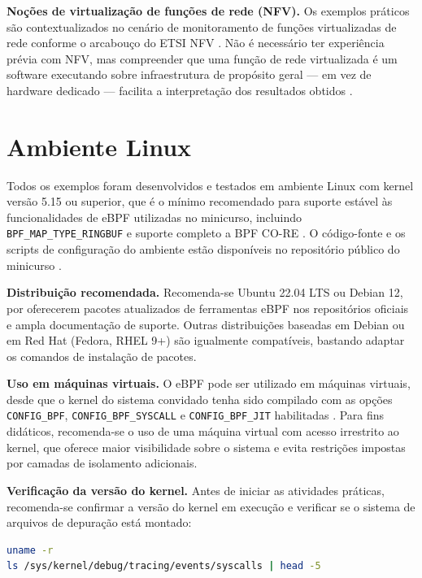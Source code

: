 \textbf{Noções de virtualização de funções de rede (NFV).}
Os exemplos práticos são contextualizados no cenário de monitoramento de funções
virtualizadas de rede conforme o arcabouço do ETSI NFV \cite{etsi2014}.
Não é necessário ter experiência prévia com NFV, mas compreender que uma função
de rede virtualizada é um software executando sobre infraestrutura de propósito
geral --- em vez de hardware dedicado --- facilita a interpretação dos resultados
obtidos \cite{venancio2021}.

\section{Ambiente Linux}

Todos os exemplos foram desenvolvidos e testados em ambiente Linux com kernel
versão 5.15 ou superior, que é o mínimo recomendado para suporte estável às
funcionalidades de eBPF utilizadas no minicurso, incluindo
\texttt{BPF\_MAP\_TYPE\_RINGBUF} e suporte completo a BPF CO-RE
\cite{linuxkernel2024}.
O código-fonte e os scripts de configuração do ambiente estão disponíveis no
repositório público do minicurso \cite{plinta2026repo}.

\textbf{Distribuição recomendada.}
Recomenda-se Ubuntu 22.04 LTS ou Debian 12, por oferecerem pacotes atualizados
de ferramentas eBPF nos repositórios oficiais e ampla documentação de suporte.
Outras distribuições baseadas em Debian ou em Red Hat (Fedora, RHEL 9+) são
igualmente compatíveis, bastando adaptar os comandos de instalação de pacotes.

\textbf{Uso em máquinas virtuais.}
O eBPF pode ser utilizado em máquinas virtuais, desde que o kernel do sistema
convidado tenha sido compilado com as opções \texttt{CONFIG\_BPF},
\texttt{CONFIG\_BPF\_SYSCALL} e \texttt{CONFIG\_BPF\_JIT} habilitadas
\cite{linuxkernel2024}.
Para fins didáticos, recomenda-se o uso de uma máquina virtual com acesso
irrestrito ao kernel, que oferece maior visibilidade sobre o sistema e evita
restrições impostas por camadas de isolamento adicionais.

\textbf{Verificação da versão do kernel.}
Antes de iniciar as atividades práticas, recomenda-se confirmar a versão do kernel
em execução e verificar se o sistema de arquivos de depuração está montado:

\begin{lstlisting}[language=bash,
  caption={Verificação de versão do kernel e disponibilidade de tracepoints.}]
uname -r
ls /sys/kernel/debug/tracing/events/syscalls | head -5
\end{lstlisting}

